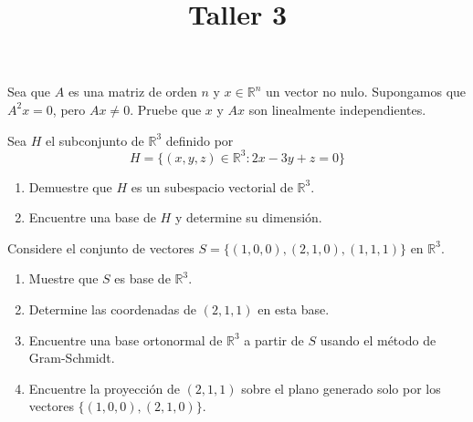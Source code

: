 \documentclass[a4paper]{article}
\title{Taller 3}
\date{}
\begin{document}
\maketitle
\thispagestyle{fancy}

\item Sea que $A$ es una matriz de orden $n$ y $x\in \mathbb{R}^n$ un vector no nulo. Supongamos
que $A^2x = 0$, pero $Ax \neq 0$. Pruebe que $x$ y $Ax$ son linealmente independientes.


    \item Sea $H$ el subconjunto de $\mathbb{R}^3$ definido por
\[H=\{(x,y,z)\in\mathbb{R}^3\colon 2x-3y+z=0  \}\]

\begin{enumerate}
    \item  Demuestre que $H$ es un subespacio vectorial de $\mathbb{R}^3$.
    \item  Encuentre una base de $H$ y determine su dimensión.
    \end{enumerate}
\item Considere el conjunto de vectores $S = \{( 1 , 0 , 0 ), ( 2 , 1 , 0 ) , ( 1 , 1 , 1 )\}$ en $\mathbb{R}^{3}$.
\begin{enumerate}
    \item Muestre que $S$ es base de $\mathbb{R}^{3}$.
    \item Determine las coordenadas de $ ( 2 , 1 , 1 )$ en esta base.
    \item Encuentre una base ortonormal de $\mathbb{R}^{3}$ a partir de $S$ usando el método de Gram-Schmidt.
    \item Encuentre la proyección de $ ( 2 , 1 , 1 )$ sobre el plano generado solo por los vectores $\{( 1 , 0 , 0 ), ( 2 , 1 , 0 )\}$.
\end{enumerate}
\end{document}
